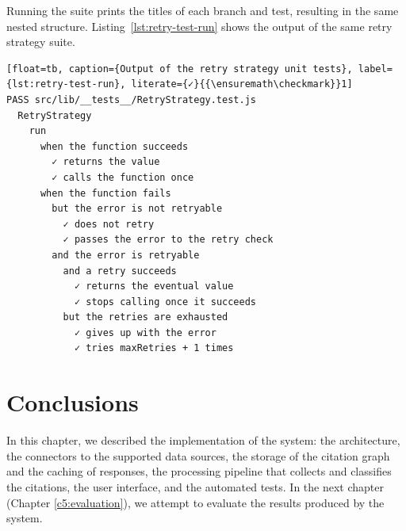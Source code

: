 Running the suite prints the titles of each branch and test, resulting in the same nested structure.
Listing~\ref{lst:retry-test-run} shows the output of the same retry strategy suite.

\begin{lstlisting}[float=tb, caption={Output of the retry strategy unit tests}, label={lst:retry-test-run}, literate={✓}{{\ensuremath\checkmark}}1]
PASS src/lib/__tests__/RetryStrategy.test.js
  RetryStrategy
    run
      when the function succeeds
        ✓ returns the value
        ✓ calls the function once
      when the function fails
        but the error is not retryable
          ✓ does not retry
          ✓ passes the error to the retry check
        and the error is retryable
          and a retry succeeds
            ✓ returns the eventual value
            ✓ stops calling once it succeeds
          but the retries are exhausted
            ✓ gives up with the error
            ✓ tries maxRetries + 1 times
\end{lstlisting}


\section{Conclusions} \label{sec:ch4-conclusions}

In this chapter, we described the implementation of the system: the architecture, the connectors to the supported data sources, the storage of the citation graph and the caching of responses, the processing pipeline that collects and classifies the citations, the user interface, and the automated tests.
In the next chapter (Chapter \ref{c5:evaluation}), we attempt to evaluate the results produced by the system.
